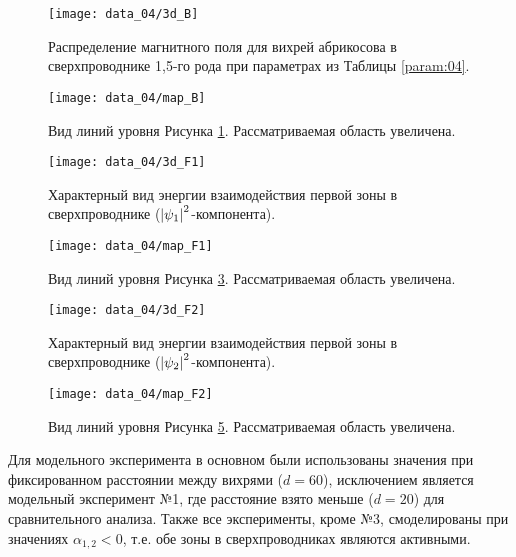 \begin{figure}[h!]
    \center
    \texttt{[image: data\_04/3d\_B]}
    \caption{Распределение магнитного поля для вихрей абрикосова в 
        сверхпроводнике 1,5-го рода при параметрах из Таблицы \ref{param:04}.}
    \label{img:3d-field-B-04}
\end{figure}

\begin{figure}[h!]
    \center
    \texttt{[image: data\_04/map\_B]}
    \caption{Вид линий уровня Рисунка \ref{img:3d-field-B-04}. 
        Рассматриваемая область увеличена.}
    \label{img:map-field-B-04}
\end{figure}

\begin{figure}[h!]
    \center
    \texttt{[image: data\_04/3d\_F1]}
    \caption{Характерный вид энергии взаимодействия первой зоны в 
        сверхпроводнике (\( \left| \psi_1 \right|^2 \)-компонента).}
    \label{img:3d-band-1-04}
\end{figure}

\begin{figure}[h!]
    \center
    \texttt{[image: data\_04/map\_F1]}
    \caption{Вид линий уровня Рисунка \ref{img:3d-band-1-04}. 
        Рассматриваемая область увеличена.}
    \label{img:map-band-1-04}
\end{figure}

\begin{figure}[h!]
    \center
    \texttt{[image: data\_04/3d\_F2]}
    \caption{Характерный вид энергии взаимодействия первой зоны в 
        сверхпроводнике (\( \left| \psi_2 \right|^2 \)-компонента).}
    \label{img:3d-band-2-04}
\end{figure}

\begin{figure}[h!]
    \center
    \texttt{[image: data\_04/map\_F2]}
    \caption{Вид линий уровня Рисунка \ref{img:3d-band-2-04}. 
        Рассматриваемая область увеличена.}
    \label{img:map-band-2-04}
\end{figure}

\clearpage

Для модельного эксперимента в основном были использованы значения при 
фиксированном расстоянии между вихрями (\( d = 60 \)), исключением является 
модельный эксперимент №1, где расстояние взято меньше (\( d = 20 \)) для 
сравнительного анализа. Также все эксперименты, кроме №3, смоделированы при 
значениях \( \alpha_{1,2} < 0 \), т.е. обе зоны в сверхпроводниках являются 
активными.

